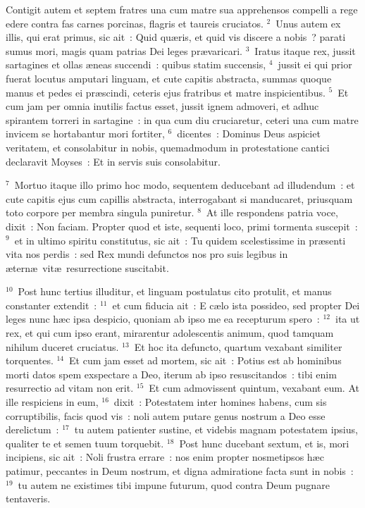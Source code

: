 \bchapter
\lettrine[lines=3,image=true,loversize=0.05,lraise=-0.03]{C}{}ontigit autem et septem fratres una cum matre sua apprehensos compelli a rege edere contra fas carnes porcinas, flagris et taureis cruciatos.
${}^{2}$~Unus autem ex illis, qui erat primus, sic ait~: Quid qu\ae ris, et quid vis discere a nobis~? parati sumus mori, magis quam patrias Dei leges pr\ae varicari.
${}^{3}$~Iratus itaque rex, jussit sartagines et ollas \ae neas succendi~: quibus statim succensis,
${}^{4}$~jussit ei qui prior fuerat locutus amputari linguam, et cute capitis abstracta, summas quoque manus et pedes ei pr\ae scindi, ceteris ejus fratribus et matre inspicientibus.
${}^{5}$~Et cum jam per omnia inutilis factus esset, jussit ignem admoveri, et adhuc spirantem torreri in sartagine~: in qua cum diu cruciaretur, ceteri una cum matre invicem se hortabantur mori fortiter,
${}^{6}$~dicentes~: Dominus Deus aspiciet veritatem, et consolabitur in nobis, quemadmodum in protestatione cantici declaravit Moyses~: Et in servis suis consolabitur.


${}^{7}$~Mortuo itaque illo primo hoc modo, sequentem deducebant ad illudendum~: et cute capitis ejus cum capillis abstracta, interrogabant si manducaret, priusquam toto corpore per membra singula puniretur.
${}^{8}$~At ille respondens patria voce, dixit~: Non faciam. Propter quod et iste, sequenti loco, primi tormenta suscepit~:
${}^{9}$~et in ultimo spiritu constitutus, sic ait~: Tu quidem scelestissime in pr\ae senti vita nos perdis~: sed Rex mundi defunctos nos pro suis legibus in \ae tern\ae\ vit\ae\ resurrectione suscitabit.


${}^{10}$~Post hunc tertius illuditur, et linguam postulatus cito protulit, et manus constanter extendit~:
${}^{11}$~et cum fiducia ait~: E c\ae lo ista possideo, sed propter Dei leges nunc h\ae c ipsa despicio, quoniam ab ipso me ea recepturum spero~:
${}^{12}$~ita ut rex, et qui cum ipso erant, mirarentur adolescentis animum, quod tamquam nihilum duceret cruciatus.
${}^{13}$~Et hoc ita defuncto, quartum vexabant similiter torquentes.
${}^{14}$~Et cum jam esset ad mortem, sic ait~: Potius est ab hominibus morti datos spem exspectare a Deo, iterum ab ipso resuscitandos~: tibi enim resurrectio ad vitam non erit.
${}^{15}$~Et cum admovissent quintum, vexabant eum. At ille respiciens in eum,
${}^{16}$~dixit~: Potestatem inter homines habens, cum sis corruptibilis, facis quod vis~: noli autem putare genus nostrum a Deo esse derelictum~:
${}^{17}$~tu autem patienter sustine, et videbis magnam potestatem ipsius, qualiter te et semen tuum torquebit.
${}^{18}$~Post hunc ducebant sextum, et is, mori incipiens, sic ait~: Noli frustra errare~: nos enim propter nosmetipsos h\ae c patimur, peccantes in Deum nostrum, et digna admiratione facta sunt in nobis~:
${}^{19}$~tu autem ne existimes tibi impune futurum, quod contra Deum pugnare tentaveris.


